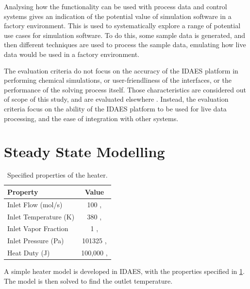 \documentclass[12pt]{article}
\begin{document}
Analysing how the functionality can be used with process data and control systems gives an indication of the potential value of simulation software in a factory environment. This is used to systematically explore a range of potential use cases for simulation software. 
To do this, some sample data is generated, and then different techniques are used to process the sample data, emulating how live data would be used in a factory environment.

The evaluation criteria do not focus on the accuracy of the IDAES platform in performing chemical simulations, or user-friendliness of the interfaces, or the performance of the solving process itself. Those characteristics are considered out of scope of this study, and are evaluated elsewhere \cite{hart2011pyomo} \cite{myhre2022investigation}. Instead, the evaluation criteria focus on the ability of the IDAES platform to be used for live data processing, and the ease of integration with other systems.









\section{Steady State Modelling}

\begin{table}[h]
    \centering
    \begin{tabular}{|l|c|}
        \hline
        \textbf{Property} & \textbf{Value} \\
        \hline
        Inlet Flow (mol/s) & 100 , \\
        \hline
        Inlet Temperature (K) & 380 , \\
        \hline
        Inlet Vapor Fraction & 1 ,  \\
        \hline
        Inlet Pressure (Pa) & 101325 ,  \\
        \hline
        Heat Duty (J) & 100,000 , \\
        \hline
    \end{tabular}
    \caption{Specified properties of the heater.}
    \label{tab:heater_properties}
\end{table}

A simple heater model is developed in IDAES, with the properties specified in \cref{tab:heater_properties}. The model is then solved to find the outlet temperature.
\end{document}
